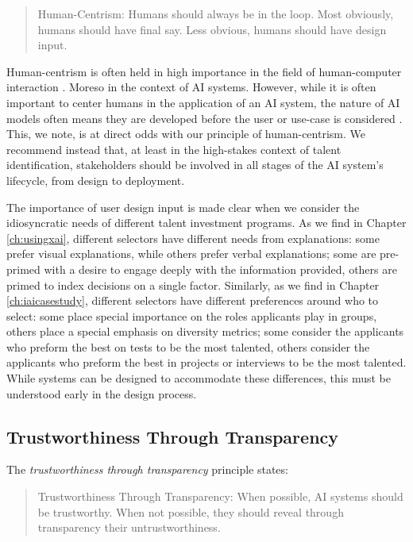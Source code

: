 \begin{quote}
    Human-Centrism: Humans should always be in the loop. Most obviously, humans should have final say. Less obvious, humans should have design input.
\end{quote}

Human-centrism is often held in high importance in the field of human-computer interaction \cite{findasource}. Moreso in the context of AI systems. However, while it is often important to center humans in the application of an AI system, the nature of AI models often means they are developed before the user or use-case is considered \cite{findasource}. This, we note, is at direct odds with our principle of human-centrism. We recommend instead that, at least in the high-stakes context of talent identification, stakeholders should be involved in all stages of the AI system's lifecycle, from design to deployment.

The importance of user design input is made clear when we consider the idiosyncratic needs of different talent investment programs. As we find in Chapter \ref{ch:usingxai}, different selectors have different needs from explanations: some prefer visual explanations, while others prefer verbal explanations; some are pre-primed with a desire to engage deeply with the information provided, others are primed to index decisions on a single factor. Similarly, as we find in Chapter \ref{ch:iaicasestudy}, different selectors have different preferences around who to select: some place special importance on the roles applicants play in groups, others place a special emphasis on diversity metrics; some consider the applicants who preform the best on tests to be the most talented, others consider the applicants who preform the best in projects or interviews to be the most talented. While systems can be designed to accommodate these differences, this must be understood early in the design process.

\subsection{Trustworthiness Through Transparency}
The \emph{trustworthiness through transparency} principle states:

\begin{quote}
    Trustworthiness Through Transparency: When possible, AI systems should be trustworthy. When not possible, they should reveal through transparency their untrustworthiness.
\end{quote}

